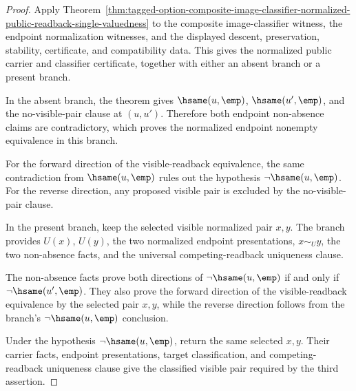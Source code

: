 \begin{proof}
Apply
Theorem~\ref{thm:tagged-option-composite-image-classifier-normalized-public-readback-single-valuedness}
to the composite image-classifier witness, the endpoint normalization witnesses,
and the displayed descent, preservation, stability, certificate, and
compatibility data. This gives the normalized public carrier and classifier
certificate, together with either an absent branch or a present branch.

In the absent branch, the theorem gives $\hsame(u,\emp)$, $\hsame(u',\emp)$, and
the no-visible-pair clause at $(u,u')$. Therefore both endpoint non-absence
claims are contradictory, which proves the normalized endpoint nonempty
equivalence in this branch.

For the forward direction of the visible-readback equivalence, the same
contradiction from $\hsame(u,\emp)$ rules out the hypothesis
$\neg\hsame(u,\emp)$. For the reverse direction, any proposed visible pair is
excluded by the no-visible-pair clause.

In the present branch, keep the selected visible normalized pair $x,y$. The
branch provides $U(x)$, $U(y)$, the two normalized endpoint presentations,
$x\sim_U y$, the two non-absence facts, and the universal competing-readback
uniqueness clause.

The non-absence facts prove both directions of
$\neg\hsame(u,\emp)$ if and only if $\neg\hsame(u',\emp)$. They also prove the
forward direction of the visible-readback equivalence by the selected pair
$x,y$, while the reverse direction follows from the branch's
$\neg\hsame(u,\emp)$ conclusion.

Under the hypothesis $\neg\hsame(u,\emp)$, return the same selected $x,y$.
Their carrier facts, endpoint presentations, target classification, and
competing-readback uniqueness clause give the classified visible pair required
by the third assertion.
\end{proof}
